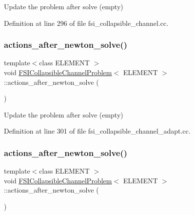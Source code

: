 Update the problem after solve (empty) 



Definition at line 296 of file fsi\+\_\+collapsible\+\_\+channel.\+cc.

\mbox{\label{classFSICollapsibleChannelProblem_a49780267c05f4c6ecbed11bfc6b9956b}} 
\subsubsection{\texorpdfstring{actions\+\_\+after\+\_\+newton\+\_\+solve()}{actions\_after\_newton\_solve()}\hspace{0.1cm}{\footnotesize\ttfamily [2/4]}}
{\footnotesize\ttfamily template$<$class E\+L\+E\+M\+E\+NT $>$ \\
void \hyperlink{classFSICollapsibleChannelProblem}{F\+S\+I\+Collapsible\+Channel\+Problem}$<$ E\+L\+E\+M\+E\+NT $>$\+::actions\+\_\+after\+\_\+newton\+\_\+solve (\begin{DoxyParamCaption}{ }\end{DoxyParamCaption})\hspace{0.3cm}{\ttfamily [inline]}}



Update the problem after solve (empty) 



Definition at line 301 of file fsi\+\_\+collapsible\+\_\+channel\+\_\+adapt.\+cc.

\mbox{\label{classFSICollapsibleChannelProblem_a49780267c05f4c6ecbed11bfc6b9956b}} 
\subsubsection{\texorpdfstring{actions\+\_\+after\+\_\+newton\+\_\+solve()}{actions\_after\_newton\_solve()}\hspace{0.1cm}{\footnotesize\ttfamily [3/4]}}
{\footnotesize\ttfamily template$<$class E\+L\+E\+M\+E\+NT $>$ \\
void \hyperlink{classFSICollapsibleChannelProblem}{F\+S\+I\+Collapsible\+Channel\+Problem}$<$ E\+L\+E\+M\+E\+NT $>$\+::actions\+\_\+after\+\_\+newton\+\_\+solve (\begin{DoxyParamCaption}{ }\end{DoxyParamCaption})\hspace{0.3cm}{\ttfamily [inline]}}



